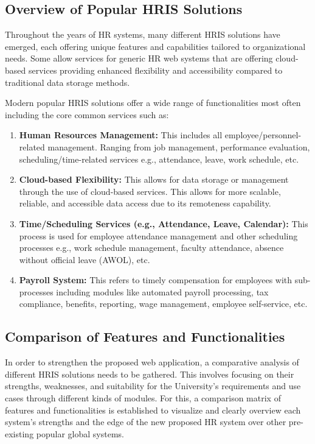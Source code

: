     \subsection{Overview of Popular HRIS Solutions}
    Throughout the years of HR systems, many different HRIS solutions have emerged, each offering unique features and capabilities tailored to organizational needs. Some allow services for generic HR web systems that are offering cloud-based services providing enhanced flexibility and accessibility compared to traditional data storage methods.

    Modern popular HRIS solutions offer a wide range of functionalities most often including the core common services such as:

    \begin{enumerate}
        \item \textbf{Human Resources Management:} This includes all employee/personnel-related management. Ranging from job management, performance evaluation, scheduling/time-related services e.g., attendance, leave, work schedule, etc.
        \item \textbf{Cloud-based Flexibility:} This allows for data storage or management through the use of cloud-based services. This allows for more scalable, reliable, and accessible data access due to its remoteness capability.
        \item \textbf{Time/Scheduling Services (e.g., Attendance, Leave, Calendar):} This process is used for employee attendance management and other scheduling processes e.g., work schedule management, faculty attendance, absence without official leave (AWOL), etc.
        \item \textbf{Payroll System:} This refers to timely compensation for employees with sub-processes including modules like automated payroll processing, tax compliance, benefits, reporting, wage management, employee self-service, etc.
    \end{enumerate}

    \subsection{Comparison of Features and Functionalities}
    In order to strengthen the proposed web application, a comparative analysis of different HRIS solutions needs to be gathered. This involves focusing on their strengths, weaknesses, and suitability for the University's requirements and use cases through different kinds of modules. For this, a comparison matrix of features and functionalities is established to visualize and clearly overview each system's strengths and the edge of the new proposed HR system over other pre-existing popular global systems.

